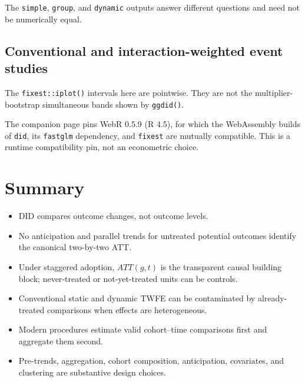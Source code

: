 The \texttt{simple}, \texttt{group}, and \texttt{dynamic} outputs answer
different questions and need not be numerically equal.

\subsection{Conventional and interaction-weighted event studies}


The \texttt{fixest::iplot()} intervals here are pointwise.  They are not the
multiplier-bootstrap simultaneous bands shown by \texttt{ggdid()}.

The companion page pins WebR 0.5.9 (R 4.5), for which the WebAssembly builds of
\texttt{did}, its \texttt{fastglm} dependency, and \texttt{fixest} are mutually
compatible.  This is a runtime compatibility pin, not an econometric choice.

\section*{Summary}

\begin{itemize}
  \item DID compares outcome changes, not outcome levels.
  \item No anticipation and parallel trends for untreated potential outcomes
        identify the canonical two-by-two ATT.
  \item Under staggered adoption, $ATT(g,t)$ is the transparent causal building
        block; never-treated or not-yet-treated units can be controls.
  \item Conventional static and dynamic TWFE can be contaminated by
        already-treated comparisons when effects are heterogeneous.
  \item Modern procedures estimate valid cohort--time comparisons first and
        aggregate them second.
  \item Pre-trends, aggregation, cohort composition, anticipation, covariates,
        and clustering are substantive design choices.
\end{itemize}

